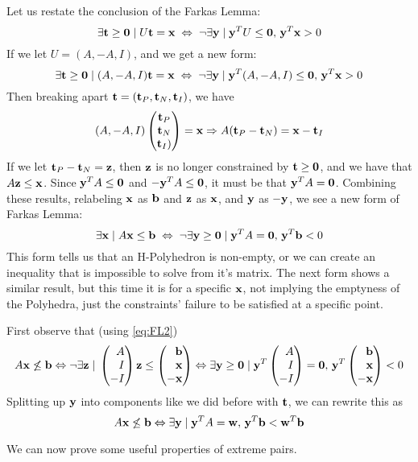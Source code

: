 Let us restate the conclusion of the Farkas Lemma:
\newcommand{\xor}{\;\Leftrightarrow\;\neg}
\[ \exists \t\geq\0 \st U\t = \x \xor \exists \y\st \y^TU\leq\0,\, \y^T\x > 0 \]
If we let $U = (A,-A,I)$, and  we get a new form:
\[ \exists \t \geq\0 \st (A,-A,I)\t = \x \xor \exists \y\st \y^T(A,-A,I)\leq\0,\, \y^T\x > 0 \]
Then breaking apart $\mathbf{t} = (\mathbf{t}_P,\mathbf{t}_N,\mathbf{t}_I)$, we have
\[ (A,-A,I)\begin{pmatrix}\mathbf{t}_P\\ \mathbf{t}_N\\ \mathbf{t}_I)\end{pmatrix} = \mathbf{x} \Rightarrow
	A(\mathbf{t}_P - \mathbf{t}_N) = \mathbf{x} - \mathbf{t}_I \]
If we let $\mathbf{t}_P - \mathbf{t}_N = \mathbf{z}$, then $\mathbf{z}$ is no longer constrained by $\mathbf{t} \geq\mathbf{0}$, and we have that $A\mathbf{z} \leq \mathbf{x}$.  Since $\mathbf{y}^T A \leq \mathbf{0}$ and $-\mathbf{y}^T A\leq \mathbf{0}$, it must be that $\mathbf{y}^T A = \mathbf{0}$.  Combining these results, relabeling $\mathbf{x}$ as $\mathbf{b}$ and $\mathbf{z}$ as $\mathbf{x}$, and $\mathbf{y}$ as $-\mathbf{y}$, we see a new form of Farkas Lemma:
\begin{equation} \label{eq:FL2}
	\exists \x \st A\x \leq \b \xor \exists \y\geq\0 \st \y^TA = \0,\, \y^T\b < 0
\end{equation}
This form tells us that an H-Polyhedron is non-empty, or we can create an inequality that is impossible to solve from it's matrix.  The next form shows a similar result, but this time it is for a specific $\mathbf{x}$, not implying the emptyness of the Polyhedra, just the constraints' failure to be satisfied at a specific point.

First observe that (using \eqref{eq:FL2})
\[ A\x \not\leq \b \Leftrightarrow \neg \exists \z\st
	\pmb A\\I\\-I\pme \z \leq \pmb \b\\ \x\\ -\x \pme \Leftrightarrow
	\exists \y\geq\0\st \y^T\pmb A\\I\\-I\pme =\0,\, \y^T\pmb \b\\ \x\\ -\x \pme < 0\]
Splitting up $\mathbf{y}$ into components like we did before with $\mathbf{t}$, we can rewrite this as
\begin{equation} \label{eq:FL3}
	A\mathbf{x} \not\leq \mathbf{b} \Leftrightarrow \exists \mathbf{y}\;|\; \mathbf{y}^T A = \mathbf{w},\, \mathbf{y}^T \mathbf{b} < \mathbf{w}^T\mathbf{b}
\end{equation}

We can now prove some useful properties of extreme pairs.

